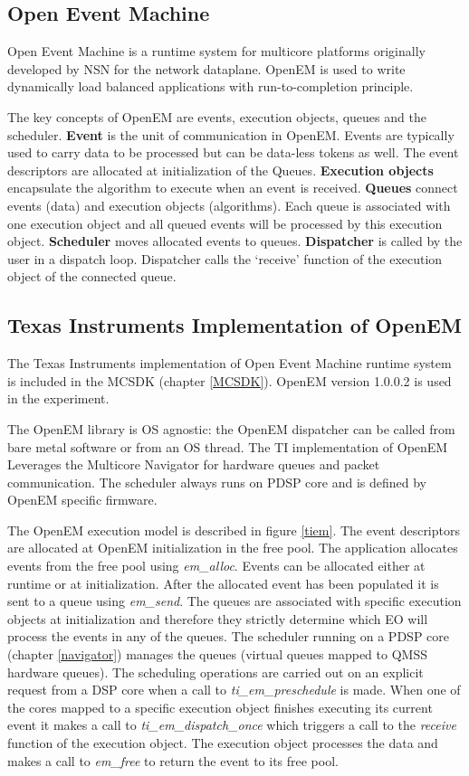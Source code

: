 \subsection{Open Event Machine}
Open Event Machine is a runtime system for multicore platforms originally developed by NSN for the network dataplane. OpenEM is used to write dynamically load balanced applications with run-to-completion principle.

The key concepts of OpenEM are events, execution objects, queues and the scheduler. \textbf{Event} is the unit of communication in OpenEM. Events are typically used to carry data to be processed but can be data-less tokens as well. The event descriptors are allocated at initialization of the Queues. \textbf{Execution objects} encapsulate the algorithm to execute when an event is received. \textbf{Queues} connect events (data) and execution objects (algorithms). Each queue is associated with one execution object and all queued events will be processed by this execution object. \textbf{Scheduler} moves allocated events to queues. \textbf{Dispatcher} is called by the user in a dispatch loop. Dispatcher calls the ‘receive’ function of the execution object of the connected queue.

\subsection{Texas Instruments Implementation of OpenEM}
The Texas Instruments implementation of Open Event Machine runtime system is included in the MCSDK (chapter \ref{MCSDK}). OpenEM version 1.0.0.2 is used in the experiment.

The OpenEM library is OS agnostic: the OpenEM dispatcher can be called from bare metal software or from an OS thread. The TI implementation of OpenEM Leverages the Multicore Navigator for hardware queues and packet communication. The scheduler always runs on PDSP core and is defined by OpenEM specific firmware.

The OpenEM execution model is described in figure \ref{tiem}. The event descriptors are allocated at OpenEM initialization in the free pool. The application allocates events from the free pool using \textit{em\_alloc}. Events can be allocated either at runtime or at initialization. After the allocated event has been populated it is sent to a queue using \textit{em\_send}. The queues are associated with specific execution objects at initialization and therefore they strictly determine which EO will process the events in any of the queues. The scheduler running on a PDSP core (chapter \ref{navigator}) manages the queues (virtual queues mapped to QMSS hardware queues). The scheduling operations are carried out on an explicit request from a DSP core when a call to \textit{ti\_em\_preschedule} is made. When one of the cores mapped to a specific execution object finishes executing its current event it makes a call to \textit{ti\_em\_dispatch\_once} which triggers a call to the \textit{receive} function of the execution object. The execution object processes the data and makes a call to \textit{em\_free} to return the event to its free pool.

